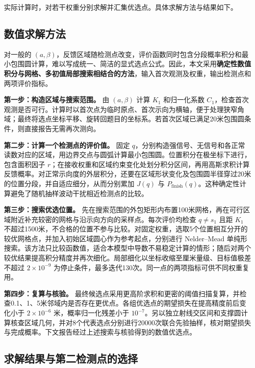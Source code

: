 \documentclass[UTF8,a4paper,zihao=-4,fontset=none]{ctexart}
\begin{document}
实际计算时，对若干权重分别求解并汇集优选点。具体求解方法与结果如下。

\subsection{数值求解方法}

对一般的 \((a,\beta)\)，反馈区域随检测点改变，评价函数同时包含分段概率积分和最小包围圆计算，难以写成统一、简洁的显式选点公式。因此，本文采用\textbf{确定性数值积分与网格、多初值局部搜索相结合的方法}，输入首次观测及权重，输出检测点和两项评价指标。

\textbf{第一步：构造区域与搜索范围。} 由 \((a,\beta)\) 计算 \(K_1\) 和归一化系数 \(C_1\)，检查首次观测是否可行。计算时以首次点为临时原点、首次示向为横轴，便于处理狭窄角域；最终将选点坐标平移、旋转回题目的坐标系。若首次区域已满足20米包围圆条件，则直接报告无需再次测向。

\textbf{第二步：计算一个检测点的评价值。} 固定 \(q\)，分别构造强信号、无信号和各正常读数对应的区域，用边界交点与圆弧计算最小包围圆。位置积分在极坐标下进行，包含面积因子 \(r\)；在接收权重和区域约束变化处划分积分区间，再用高斯求积计算反馈概率。对正常示向度的外层积分，还要在区域形状变化及包围圆半径穿过20米的位置分段，并自适应细分，从而分别累加 \(J(q)\) 与 \(P_{\mathrm{finish}}(q)\)。这种确定性计算避免了随机抽样波动干扰相近检测点的比较。

\textbf{第三步：搜索优选位置。} 先在搜索范围的外包矩形内布置100米网格，再在可行区域附近补充较密的网格与沿示向方向的采样点。每次评价均检查 \(q\ne s_1\) 且距 \(K_1\) 不超过1500米，不合格的位置不参与比较。对固定权重，选取5个位置相互分开的较优网格点，并加入初始区域圆心作为参考起点，分别进行 Nelder--Mead 单纯形搜索。该方法只比较函数值，适合本模型中导数不易稳定计算的情形；随后对两个较优结果提高积分精度并再次细化。局部细化以坐标收缩至厘米量级、目标值极差不超过 \(2\times10^{-9}\) 为停止条件，最多迭代130次。同一点的两项指标可供不同权重复用。

\textbf{第四步：复算与核验。} 最终候选点采用更高阶求积和更密的阈值扫描复算，并检查0.1、1、5米邻域内是否存在更优点。各组优选点的期望损失在提高精度前后变化小于 \(2\times10^{-6}\) 米，概率归一化残差小于 \(10^{-7}\)。另以独立射线交区间和支撑圆计算核查区域几何，并对8个代表选点分别进行20000次联合先验抽样，核对期望损失与完成概率。下文报告经过上述搜索与核验得到的数值优选点。

\subsection{求解结果与第二检测点的选择}
\end{document}
